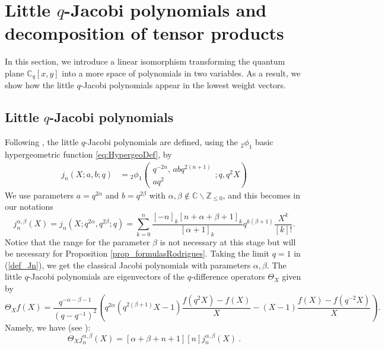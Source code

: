\documentclass[a4paper,12pt]{article}
\numberwithin{equation}{section}
\newcommand{\C}{\mathbb{C}}
\newcommand{\Z}{\mathbb{Z}}
\theoremstyle{rem}
\newenvironment{rema}
  {\pushQED{\qed}\renewcommand{\qedsymbol}{$\scriptstyle{\blacktriangle}$}\remax}
  {\popQED\endremax}
\theoremstyle{definition}
\begin{document}
\section{Little $q$-Jacobi polynomials and decomposition of tensor products}\label{sec3}

In this section, we introduce a linear isomorphism transforming the quantum plane $\C_q[x,y]$ into a more space of polynomials in two variables. As a result, we show how the little $q$-Jacobi polynomials appear in the lowest weight vectors.

\subsection{Little $q$-Jacobi polynomials}

Following \cite{KLS10}, the little $q$-Jacobi polynomials are defined, using the ${}_2\phi_1$ basic hypergeometric function \eqref{eq:HypergeoDef}, by
\begin{align*}
j_n(X;a,b;q)&={}_2\phi_1\left(\begin{array}{c} q^{-2n},\,abq^{2(n+1)}\\ a q^2\end{array};q,q^2X\right)
\end{align*}
We use parameters $a=q^{2\alpha}$ and $b=q^{2\beta}$ with $\alpha, \beta \notin \C\backslash \Z_{\leq 0}$, and this becomes in our notations
\begin{equation}\label{def_Jn}
j_n^{\alpha,\beta}(X)=j_n(X;q^{2\alpha},q^{2\beta};q) =\sum_{k=0}^n \frac{[-n]_k[n+\alpha+\beta+1]_k}{[\alpha+1]_k}q^{k(\beta+1)} \frac{X^k}{[k]!}.
\end{equation}
Notice that the range for the parameter $\beta$ is not necessary at this stage but will be necessary for Proposition \ref{prop_formulasRodrigues}. 
\begin{rema}
Taking the limit $q=1$ in (\ref{def_Jn}), we get the classical Jacobi polynomials with parameters $\alpha,\beta$.
\end{rema}
The little $q$-Jacobi polynomials are eigenvectors of the $q$-difference operators $\Theta_X$ given by
\begin{equation}\label{eq:Def_Theta}
\Theta_X f(X)=\frac{q^{-\alpha-\beta-1}}{(q-q^{-1})^2}\left(q^{2\alpha}(q^{2(\beta+1)}X-1)\frac{f(q^2X)-f(X)}{X}-(X-1)\frac{f(X)-f(q^{-2}X)}{X}\right).
\end{equation}
Namely, we have (see  \cite{KLS10}):
\begin{equation}\label{eq:eigenvector_Theta}\Theta_X j_n^{\alpha,\beta}(X)=[\alpha+\beta+n+1][n]j_n^{\alpha,\beta}(X)\ .
\end{equation}
\end{document}
